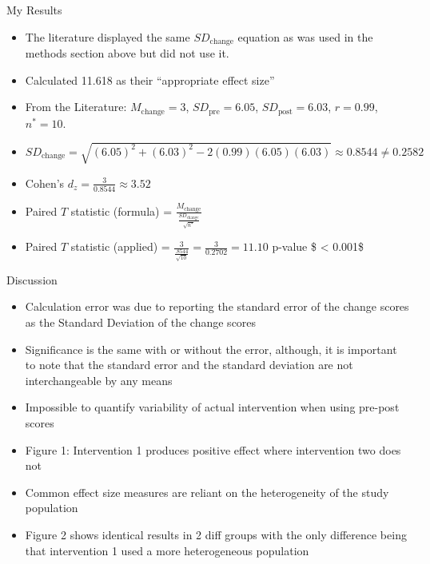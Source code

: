 \documentclass[
  ignorenonframetext,
  aspectratio=169,
]{beamer}
\providecommand{\tightlist}{%
  \setlength{\itemsep}{0pt}\setlength{\parskip}{0pt}}
\begin{document}
\begin{frame}{My Results}
\protect\hypertarget{my-results}{}
\begin{itemize}
\tightlist
\item
  The literature displayed the same \(SD_\text{change}\) equation as was
  used in the methods section above but did not use it.
\item
  Calculated 11.618 as their ``appropriate effect size''
\item
  From the Literature: \(M_\text{change}=3\), \(SD_\text{pre}=6.05\),
  \(SD_\text{post}=6.03\), \(r=0.99\), \(n^*=10\).
\item
  \(SD_{\text{change}}=\sqrt{(6.05)^2+(6.03)^2-2(0.99)(6.05)(6.03)}\approx 0.8544 \neq 0.2582\)
\item
  Cohen's \(d_z= \frac{3}{0.8544}\approx3.52\)
\item
  Paired \(T\) statistic (formula) =
  \(\frac{M_{\text{change}}}{\frac{SD_\text{change}}{\sqrt{n^*}}}\)
\item
  Paired \(T\) statistic (applied) =
  \(\frac{3}{\frac{.8544}{\sqrt{10}}}= \frac{3}{0.2702}=11.10\) p-value
  \$ \textless{} 0.001\$
\end{itemize}
\end{frame}

\begin{frame}{Discussion}
\protect\hypertarget{discussion}{}
\begin{itemize}
\item
  Calculation error was due to reporting the standard error of the
  change scores as the Standard Deviation of the change scores
\item
  Significance is the same with or without the error, although, it is
  important to note that the standard error and the standard deviation
  are not interchangeable by any means
\item
  Impossible to quantify variability of actual intervention when using
  pre-post scores
\item
  Figure 1: Intervention 1 produces positive effect where intervention
  two does not
\item
  Common effect size measures are reliant on the heterogeneity of the
  study population
\item
  Figure 2 shows identical results in 2 diff groups with the only
  difference being that intervention 1 used a more heterogeneous
  population
\end{itemize}
\end{frame}
\end{document}
